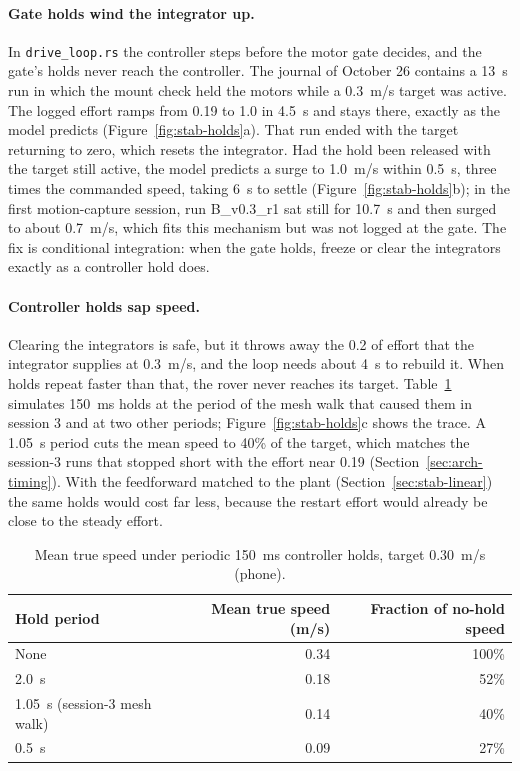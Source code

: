 \paragraph{Gate holds wind the integrator up.}
In \texttt{drive\_loop.rs} the controller steps before the motor gate decides, and the gate's holds never reach the controller.
The journal of October 26 contains a 13~s run in which the mount check held the motors while a 0.3~m/s target was active.
The logged effort ramps from 0.19 to 1.0 in 4.5~s and stays there, exactly as the model predicts (Figure~\ref{fig:stab-holds}a).
That run ended with the target returning to zero, which resets the integrator.
Had the hold been released with the target still active, the model predicts a surge to 1.0~m/s within 0.5~s, three times the commanded speed, taking 6~s to settle (Figure~\ref{fig:stab-holds}b); in the first motion-capture session, run B\_v0.3\_r1 sat still for 10.7~s and then surged to about 0.7~m/s, which fits this mechanism but was not logged at the gate.
The fix is conditional integration: when the gate holds, freeze or clear the integrators exactly as a controller hold does.

\paragraph{Controller holds sap speed.}
Clearing the integrators is safe, but it throws away the 0.2 of effort that the integrator supplies at 0.3~m/s, and the loop needs about 4~s to rebuild it.
When holds repeat faster than that, the rover never reaches its target.
Table~\ref{tab:stab-periodic} simulates 150~ms holds at the period of the mesh walk that caused them in session 3 and at two other periods; Figure~\ref{fig:stab-holds}c shows the trace.
A 1.05~s period cuts the mean speed to 40\% of the target, which matches the session-3 runs that stopped short with the effort near 0.19 (Section~\ref{sec:arch-timing}).
With the feedforward matched to the plant (Section~\ref{sec:stab-linear}) the same holds would cost far less, because the restart effort would already be close to the steady effort.

\begin{table}[ht]
\centering
\caption{Mean true speed under periodic 150~ms controller holds, target 0.30~m/s (phone).}
\label{tab:stab-periodic}
\small
\begin{tabular}{@{}l r r@{}}
\toprule
Hold period & Mean true speed (m/s) & Fraction of no-hold speed \\
\midrule
None & 0.34 & 100\% \\
2.0~s & 0.18 & 52\% \\
1.05~s (session-3 mesh walk) & 0.14 & 40\% \\
0.5~s & 0.09 & 27\% \\
\bottomrule
\end{tabular}
\end{table}


